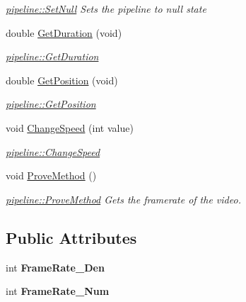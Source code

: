 \begin{DoxyCompactItemize}
\begin{DoxyCompactList}\small\item\em \hyperlink{classpipeline_a2d491af7f94ea87a4495b861a8a121fb}{pipeline\-::\-Set\-Null} Sets the pipeline to null state \end{DoxyCompactList}\item 
double \hyperlink{classpipeline_a4ff30decc13a3f67af289cd3b0188407}{Get\-Duration} (void)
\begin{DoxyCompactList}\small\item\em \hyperlink{classpipeline_a4ff30decc13a3f67af289cd3b0188407}{pipeline\-::\-Get\-Duration} \end{DoxyCompactList}\item 
double \hyperlink{classpipeline_ab99b8798b7845fd6bc5193fa75658fa7}{Get\-Position} (void)
\begin{DoxyCompactList}\small\item\em \hyperlink{classpipeline_ab99b8798b7845fd6bc5193fa75658fa7}{pipeline\-::\-Get\-Position} \end{DoxyCompactList}\item 
void \hyperlink{classpipeline_a4f5b575f03f87f6cd83049fdbd3c7f63}{Change\-Speed} (int value)
\begin{DoxyCompactList}\small\item\em \hyperlink{classpipeline_a4f5b575f03f87f6cd83049fdbd3c7f63}{pipeline\-::\-Change\-Speed} \end{DoxyCompactList}\item 
\hypertarget{classpipeline_a429bdada0ac1649898216eb3f2e162e4}{void \hyperlink{classpipeline_a429bdada0ac1649898216eb3f2e162e4}{Prove\-Method} ()}\label{classpipeline_a429bdada0ac1649898216eb3f2e162e4}

\begin{DoxyCompactList}\small\item\em \hyperlink{classpipeline_a429bdada0ac1649898216eb3f2e162e4}{pipeline\-::\-Prove\-Method} Gets the framerate of the video. \end{DoxyCompactList}\end{DoxyCompactItemize}
\subsection*{Public Attributes}
\begin{DoxyCompactItemize}
\item 
\hypertarget{classpipeline_aa89a110362294fc2dd12f48b19e20117}{int {\bfseries Frame\-Rate\-\_\-\-Den}}\label{classpipeline_aa89a110362294fc2dd12f48b19e20117}

\item 
\hypertarget{classpipeline_aa36b45729ff2aa2ad09a141532e87f54}{int {\bfseries Frame\-Rate\-\_\-\-Num}}\label{classpipeline_aa36b45729ff2aa2ad09a141532e87f54}

\end{DoxyCompactItemize}


